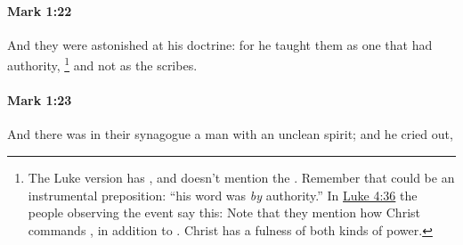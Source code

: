 		\paragraph{Mark 1:22} %
			\label{MARK-1-22}

			And they were astonished at his doctrine: for he taught them as one that had authority,%
				\footnote{%
					The Luke version has , and doesn't mention the . Remember that  could be an instrumental preposition: ``his word was \textit{by} authority.'' In \hyperref[LUKE-4-36]{Luke 4:36} the people observing the event say this:  Note that they mention how Christ commands , in addition to . Christ has a fulness of both kinds of power.
					}
			and not as the scribes.

			\begin{framed}
			\scriptsize
				\begin{compactdesc}
					\item[SBLG]  \hyperref[EXOUSIA]{} 
				\end{compactdesc}
			\end{framed}

		\paragraph{Mark 1:23} %
			\label{MARK-1-23}

			And there was in their synagogue a man with an unclean spirit; and he cried out,

